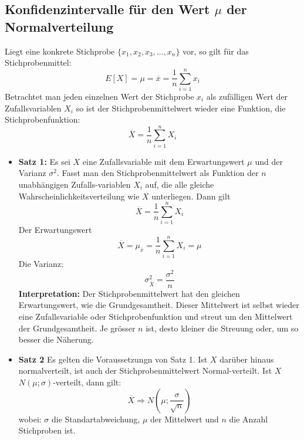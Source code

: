 \subsection{Konfidenzintervalle für den Wert $\mu$ der Normalverteilung}
Liegt eine konkrete Stichprobe $\{x_1,x_2,x_3,\ldots,x_n\}$ vor, so gilt für das Stichprobenmittel:
\begin{equation}
E[X] = \mu = \overline{x} = \frac{1}{n}\sum_{i=1}^n x_i
\end{equation}
Betrachtet man jeden einzelnen Wert der Stichprobe $x_i$ als zufälligen Wert der Zufallsvariablen $X_i$ so ist der Stichprobenmittelwert wieder eine Funktion, die Stichprobenfunktion: 
\begin{equation}
\overline{X}=\frac{1}{n}\sum_{i=1}^n X_i
\end{equation}
\begin{itemize}
	\item \textbf{Satz 1:} Es sei $X$ eine Zufallsvariable mit dem Erwartungswert $\mu$ und der Varianz $\sigma^2$. Fasst man den Stichprobenmittelwert als Funktion der $n$ unabhängigen Zufalls-variablen $X_i$ auf, die alle gleiche Wahrscheinlichkeitsverteilung wie $X$ unterliegen. Dann gilt
	\begin{equation}
	\overline{X}=\frac{1}{n}\sum_{i=1}^n X_i
	\end{equation}
		\subitem Der Erwartungswert
		\begin{equation}
		\overline{X} = \mu_{\overline{x}}=\frac{1}{n}\sum_{i=1}^n X_i = \mu
		\end{equation}
		\subitem Die Varianz:
		\begin{equation}
		\sigma^2_{\overline{X}}=\frac{\sigma^2}{n}
		\end{equation}
		\subitem \textbf{Interpretation: }Der Stichprobenmittelwert hat den gleichen Erwartungswert, wie die Grundgesamtheit. Dieser Mittelwert ist selbst wieder eine Zufallsvariable oder Stichprobenfunktion und streut um den Mittelwert der Grundgesamtheit. Je grösser $n$ ist, desto kleiner die Streuung oder, um so besser die Näherung.
	\item \textbf{Satz 2} Es gelten die Voraussetzungn von Satz 1. Ist $X$ darüber hinaus normalverteilt, ist auch der Stichprobenmittelwert Normal-verteilt. Ist $X$ $N(\mu;\sigma)$-verteilt, dann gilt:
	\begin{equation}
	\overline{X}\Rightarrow N(\mu ; \frac{\sigma}{\sqrt{n}})
	\end{equation}
	wobei: $\sigma$ die Standartabweichung, $\mu$ der Mittelwert und $n$ die Anzahl Stichproben ist.
\end{itemize}

